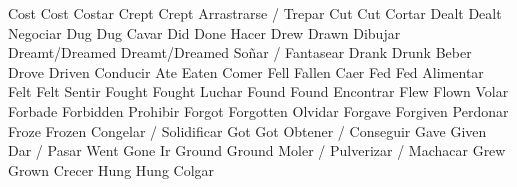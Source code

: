 	            {Cost}{}	            {Cost}{}                {Costar}{}
	            {Crept}{}	            {Crept}{}               {Arrastrarse / Trepar}{}
	            {Cut}{}	                {Cut}{}                 {Cortar}{}
	            {Dealt}{}	            {Dealt}{}               {Negociar}{}
	            {Dug}{}	                {Dug}{}                 {Cavar}{}
	                {Did}{}	                {Done}{}                {Hacer}{}
	            {Drew}{}	            {Drawn}{}               {Dibujar}{}
	            {Dreamt/Dreamed}{}	    {Dreamt/Dreamed}{}      {Soñar / Fantasear}{}
	            {Drank}{}	            {Drunk}{}               {Beber}{}
	            {Drove}{}	            {Driven}{}              {Conducir}{}
	            {Ate}{}	                {Eaten}{}               {Comer}{}
	            {Fell}{}	            {Fallen}{}              {Caer}{}
	            {Fed}{}	                {Fed}{}                 {Alimentar}{}
	            {Felt}{}	            {Felt}{}                {Sentir}{}
	            {Fought}{}	            {Fought}{}              {Luchar}{}
	            {Found}{}	            {Found}{}               {Encontrar}{}
	            {Flew}{}	            {Flown}{}               {Volar}{}
	            {Forbade}{}	            {Forbidden}{}           {Prohibir}{}
	            {Forgot}{}	            {Forgotten}{}           {Olvidar}{}
	        {Forgave}{}	            {Forgiven}{}            {Perdonar}{}
	            {Froze}{}	            {Frozen}{}              {Congelar / Solidificar}{}
	            {Got}{}	                {Got}{}                 {Obtener / Conseguir}{}
	            {Gave}{}	            {Given}{}               {Dar / Pasar}{}
	                {Went}{}	            {Gone}{}                {Ir}{}
	            {Ground}{}	            {Ground}{}              {Moler / Pulverizar / Machacar}{}
	            {Grew}{}	            {Grown}{}               {Crecer}{}
	            {Hung}{}	            {Hung}{}                {Colgar}{}
